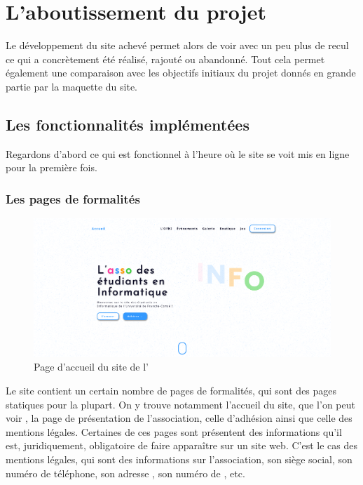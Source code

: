 \chapter{L'aboutissement du projet}
\label{chap:aboutissement}

Le développement du site achevé permet alors de voir avec un peu plus de recul ce qui a concrètement été réalisé, rajouté ou abandonné. Tout cela permet également une comparaison avec les objectifs initiaux du projet donnés en grande partie par la maquette du site.

\section{Les fonctionnalités implémentées}
\label{sec:implem}

Regardons d'abord ce qui est fonctionnel à l'heure où le site se voit mis en ligne pour la première fois.

\subsection{Les pages de formalités}
\label{subsec:pages-formalites}

\begin{figure}[h]
    \centering
    \includegraphics[width=\textwidth]{assets/pictures/home-page.png}
    \caption{Page d'accueil du site de l'\ofni}
    \label{fig:home-page}
\end{figure}

Le site contient un certain nombre de pages de formalités, qui sont des pages statiques pour la plupart. On y trouve notamment l'accueil du site, que l'on peut voir , la page de présentation de l'association, celle d'adhésion ainsi que celle des mentions légales. Certaines de ces pages sont présentent des informations qu'il est, juridiquement, obligatoire de faire apparaître sur un site web. C'est le cas des mentions légales, qui sont des informations sur l'association, son siège social, son numéro de téléphone, son adresse , son numéro de , etc.

